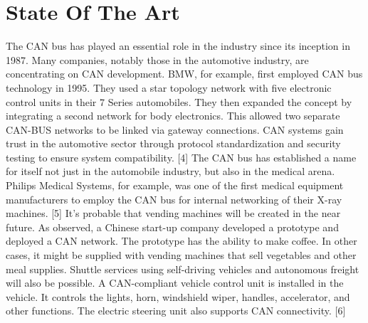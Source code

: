 
\section{State Of The Art}
The CAN bus has played an essential role in the industry since its inception in 1987. Many companies, notably those in the automotive industry, are concentrating on CAN development. BMW, for example, first employed CAN bus technology in 1995. They used a star topology network with five electronic control units in their 7 Series automobiles. They then expanded the concept by integrating a second network for body electronics. This allowed two separate CAN-BUS networks to be linked via gateway connections. CAN systems gain trust in the automotive sector through protocol standardization and security testing to ensure system compatibility. [4] The CAN bus has established a name for itself not just in the automobile industry, but also in the medical arena. Philips Medical Systems, for example, was one of the first medical equipment manufacturers to employ the CAN bus for internal networking of their X-ray machines. [5] It's probable that vending machines will be created in the near future. As observed, a Chinese start-up company developed a prototype and deployed a CAN network. The prototype has the ability to make coffee. In other cases, it might be supplied with vending machines that sell vegetables and other meal supplies. Shuttle services using self-driving vehicles and autonomous freight will also be possible. A CAN-compliant vehicle control unit is installed in the vehicle. It controls the lights, horn, windshield wiper, handles, accelerator, and other functions. The electric steering unit also supports CAN connectivity. [6]
